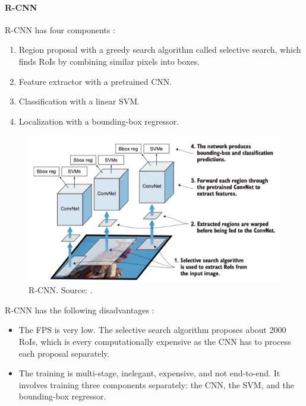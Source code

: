 \documentclass[a4paper, 11pt, oneside]{article}
\begin{document}
  \paragraph{R-CNN}

  R-CNN has four components \cite{elgendy2020deep, girshick2014rich}:

  \begin{enumerate}
    \item Region proposal with a greedy search algorithm called selective search, which finds RoIs by combining similar
    pixels into boxes.
    \item Feature extractor with a pretrained CNN.
    \item Classification with a linear SVM.
    \item Localization with a bounding-box regressor.
  \end{enumerate}

  \begin{figure}[ht]
    \begin{center}
      \includegraphics[width=.8\textwidth]{r_cnn.png}
    \end{center}
    \caption{R-CNN. Source: \cite{elgendy2020deep}.}
  \end{figure}

  R-CNN has the following disadvantages \cite{elgendy2020deep, girshick2014rich, girshick2015fast}:

  \begin{itemize}
    \item The FPS is very low. The selective search algorithm proposes about 2000 RoIs, which is every computationally
    expensive as the CNN has to process each proposal separately.
    \item The training is multi-stage, inelegant, expensive, and not end-to-end. It involves training three components
    separately: the CNN, the SVM, and the bounding-box regressor.
  \end{itemize}
\end{document}
